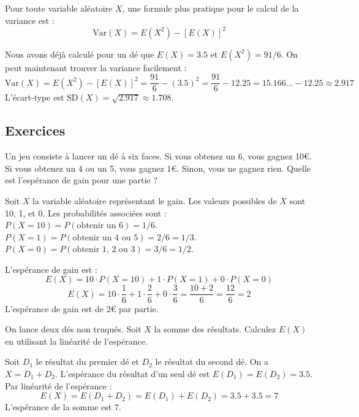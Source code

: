 \begin{theorembox}
Pour toute variable aléatoire $X$, une formule plus pratique pour le calcul de la variance est :
$$ \text{Var}(X) = E(X^2) - [E(X)]^2 $$
\end{theorembox}

\begin{examplebox}
Nous avons déjà calculé pour un dé que $E(X) = 3.5$ et $E(X^2) = 91/6$. On peut maintenant trouver la variance facilement :
$$ \text{Var}(X) = E(X^2) - [E(X)]^2 = \frac{91}{6} - (3.5)^2 = \frac{91}{6} - 12.25 = 15.166... - 12.25 \approx 2.917 $$
L'écart-type est $\text{SD}(X) = \sqrt{2.917} \approx 1.708$.
\end{examplebox}

\subsection{Exercices}

\begin{exercicebox}
Un jeu consiste à lancer un dé à six faces. Si vous obtenez un 6, vous gagnez 10€. Si vous obtenez un 4 ou un 5, vous gagnez 1€. Sinon, vous ne gagnez rien. Quelle est l'espérance de gain pour une partie ?
\end{exercicebox}

\begin{correctionbox}
Soit $X$ la variable aléatoire représentant le gain. Les valeurs possibles de $X$ sont 10, 1, et 0.
Les probabilités associées sont :
$P(X=10) = P(\text{obtenir un 6}) = 1/6$.
$P(X=1) = P(\text{obtenir un 4 ou 5}) = 2/6 = 1/3$.
$P(X=0) = P(\text{obtenir 1, 2 ou 3}) = 3/6 = 1/2$.

L'espérance de gain est :
$$ E(X) = 10 \cdot P(X=10) + 1 \cdot P(X=1) + 0 \cdot P(X=0) $$
$$ E(X) = 10 \cdot \frac{1}{6} + 1 \cdot \frac{2}{6} + 0 \cdot \frac{3}{6} = \frac{10+2}{6} = \frac{12}{6} = 2 $$
L'espérance de gain est de 2€ par partie.
\end{correctionbox}

\begin{exercicebox}
On lance deux dés non truqués. Soit $X$ la somme des résultats. Calculez $E(X)$ en utilisant la linéarité de l'espérance.
\end{exercicebox}

\begin{correctionbox}
Soit $D_1$ le résultat du premier dé et $D_2$ le résultat du second dé. On a $X = D_1 + D_2$.
L'espérance du résultat d'un seul dé est $E(D_1) = E(D_2) = 3.5$.
Par linéarité de l'espérance :
$$ E(X) = E(D_1 + D_2) = E(D_1) + E(D_2) = 3.5 + 3.5 = 7 $$
L'espérance de la somme est 7.
\end{correctionbox}

